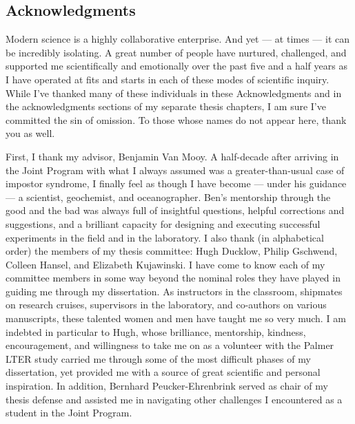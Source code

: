\begin{singlespace}
\section*{Acknowledgments}

Modern science is a highly collaborative enterprise. And yet --- at times --- it can be incredibly isolating. A great number of people have nurtured, challenged, and supported me scientifically and emotionally over the past five and a half years as I have operated at fits and starts in each of these modes of scientific inquiry. While I've thanked many of these individuals in these Acknowledgments and in the acknowledgments sections of my separate thesis chapters, I am sure I've committed the sin of omission. To those whose names do not appear here, thank you as well.

First, I thank my advisor, Benjamin Van Mooy. A half-decade after arriving in the Joint Program with what I always assumed was a greater-than-usual case of impostor syndrome, I finally feel as though I have become --- under his guidance --- a scientist, geochemist, and oceanographer. Ben's mentorship through the good and the bad was always full of insightful questions, helpful corrections and suggestions, and a brilliant capacity for designing and executing successful experiments in the field and in the laboratory. I also thank (in alphabetical order) the members of my thesis committee: Hugh Ducklow, Philip Gschwend, Colleen Hansel, and Elizabeth Kujawinski. I have come to know each of my committee members in some way beyond the nominal roles they have played in guiding me through my dissertation. As instructors in the classroom, shipmates on research cruises, supervisors in the laboratory, and co-authors on various manuscripts, these talented women and men have taught me so very much. I am indebted in particular to Hugh, whose brilliance, mentorship, kindness, encouragement, and willingness to take me on as a volunteer with the Palmer LTER study carried me through some of the most difficult phases of my dissertation, yet provided me with a source of great scientific and personal inspiration. In addition, Bernhard Peucker-Ehrenbrink served as chair of my thesis defense and assisted me in navigating other challenges I encountered as a student in the Joint Program.


\end{singlespace}
